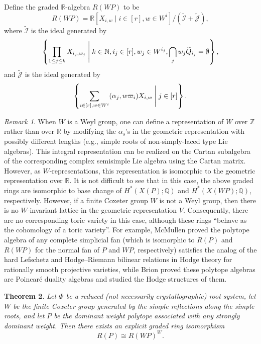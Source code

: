 \documentclass{amsart}
\newtheorem{theorem}{Theorem}[section]
\theoremstyle{definition}
\theoremstyle{remark}
\newtheorem{remark}[theorem]{Remark}
\numberwithin{equation}{section}
\begin{document}
Define the graded $\mathbb{R}$-algebra $R\left(\mathit{WP}\right)$ to be
    \begin{equation} \label{eq-def-R(WP)}
      R\left(\mathit{WP}\right)=\mathbb{R}\left[X_{i,w} \mid i \in [r], w \in W^i\right] / (\widetilde{\mathcal{I}}+ \widetilde{\mathcal{J}}),
    \end{equation}
    where $\widetilde{\mathcal{I}}$ is the ideal generated by
    \[\left\{ \prod_{1 \le j \le k} X_{i_j, w_j} \Biggm| k \in \mathbb{N}, i_j \in [r], w_j \in W^{i_j}, \bigcap_{j} w_{j} \widetilde{Q}_{i_j} = \emptyset \right\},\]
    and $\widetilde{\mathcal{J}}$ is the ideal generated by
    \[\left\{  \sum_{i \in [r], w \in W^i} (\alpha_j, w \varpi_i) X_{i,w} \Biggm| j \in [r]\right\}.\]

\begin{remark} \label{rmk-cry}
    When $W$ is a Weyl group, one can define a representation of $W$ over $\mathbb{Z}$ rather than over $\mathbb{R}$ by modifying the $\alpha_s$'s in the geometric representation with possibly different lengths (e.g., simple roots of non-simply-laced type Lie algebras). This integral representation can be realized on the Cartan subalgebra of the corresponding complex semisimple Lie algebra using the Cartan matrix. However, as $W$-representations, this representation is isomorphic to the geometric representation over $\mathbb{R}$. 
    It is not difficult to see that in this case, the above graded rings are isomorphic to base change of $H^*\left(X(P) ; \mathbb{Q}\right)$ and $H^*\left(X(\mathit{WP}) ; \mathbb{Q}\right)$, respectively. However, if a finite Coxeter group $W$ is not a Weyl group, then there is no $W$-invariant lattice in the geometric representation $V$. Consequently, there are no corresponding toric variety in this case, although these rings ``behave as the cohomology of a toric variety''. For example, McMullen \cite{mcmullen1989polytope} proved the polytope algebra of any complete simplicial fan (which is isomorphic to $R\left(P\right)$ and $R\left(\mathit{WP}\right)$ for the normal fan of $P$ and $\mathit{WP}$, respectively) satisfies the analog of the hard Lefschetz and Hodge--Riemann bilinear relations in Hodge theory for rationally smooth projective varieties, while Brion \cite{brion1997structure} proved these polytope algebras are Poincar\'e duality algebras and studied the Hodge structures of them.
\end{remark}

\begin{theorem} \label{thm-noncry}
   Let $\Phi$ be a reduced (not necessarily crystallographic) root system, let $W$ be the finite Coxeter group generated by the simple reflections along the simple roots, and let $P$ be the dominant weight polytope associated with any strongly dominant weight. Then there exists an explicit graded ring isomorphism
   \begin{equation} 
     R\left(P\right) \cong R\left(\mathit{WP}\right)^W.      
   \end{equation}

\end{theorem} 
\end{document}
